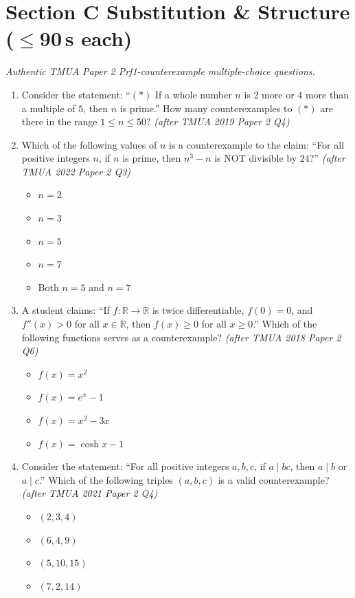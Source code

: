 \documentclass[11pt,a4paper]{article}
\begin{document}
\section*{Section C \quad Substitution \& Structure \hfill{\normalfont\small($\leq$90\,s each)}}

\noindent\textit{Authentic TMUA Paper 2 Prf1-counterexample multiple-choice questions.}

\begin{enumerate}

\item Consider the statement: ``$(*)$ If a whole number $n$ is $2$ more or $4$ more than a multiple of $5$, then $n$ is prime.'' How many counterexamples to $(*)$ are there in the range $1\leq n\leq50$? \textit{\small(after TMUA 2019 Paper 2 Q4)}

\item Which of the following values of $n$ is a counterexample to the claim: ``For all positive integers $n$, if $n$ is prime, then $n^3 - n$ is NOT divisible by $24$?'' \textit{\small(after TMUA 2022 Paper 2 Q3)}
\begin{itemize}
\item[A)] $n=2$
\item[B)] $n=3$
\item[C)] $n=5$
\item[D)] $n=7$
\item[E)] Both $n=5$ and $n=7$
\end{itemize}

\item A student claims: ``If $f:\mathbb{R}\to\mathbb{R}$ is twice differentiable, $f(0)=0$, and $f''(x) > 0$ for all $x \in \mathbb{R}$, then $f(x) \ge 0$ for all $x \ge 0$.'' Which of the following functions serves as a counterexample? \textit{\small(after TMUA 2018 Paper 2 Q6)}
\begin{itemize}
\item[A)] $f(x) = x^2$
\item[B)] $f(x) = e^x - 1$
\item[C)] $f(x) = x^2 - 3x$
\item[D)] $f(x) = \cosh x - 1$
\end{itemize}

\item Consider the statement: ``For all positive integers $a, b, c$, if $a \mid bc$, then $a \mid b$ or $a \mid c$.'' Which of the following triples $(a, b, c)$ is a valid counterexample? \textit{\small(after TMUA 2021 Paper 2 Q4)}
\begin{itemize}
\item[A)] $(2, 3, 4)$
\item[B)] $(6, 4, 9)$
\item[C)] $(5, 10, 15)$
\item[D)] $(7, 2, 14)$
\end{itemize}


\end{enumerate}
\end{document}
